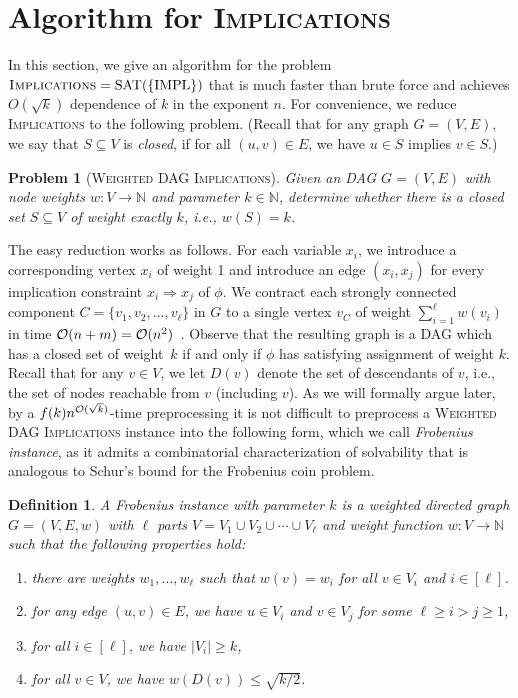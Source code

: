 \documentclass[10pt,a4paper]{article}
\newtheorem{defn}[thm]{Definition}
\newtheorem{problem}[thm]{Problem}
\newcommand{\nats}{\mathbb N}
\newcommand{\Oh}{{\cal O}}
\newcommand{\SAT}{\mathrm{SAT}}
\newcommand{\Impl}{\mathrm{IMPL}}
\newcommand{\Implication}{\textsc{Implications}\xspace}
\newcommand{\wDAGImplication}{\textsc{Weighted DAG Implications}\xspace}
\begin{document}
\section{Algorithm for \Implication}
\label{sec:implalgo}
%
In this section, we give an algorithm for the problem $\Implication = \SAT(\{\Impl\})$ that is much faster than brute force and achieves $O(\sqrt{k})$ dependence of $k$ in the exponent $n$. 
For convenience, we reduce \Implication to the following problem. (Recall that for any graph $G=(V,E)$, we say that $S\subseteq V$ is \emph{closed}, if for all $(u,v)\in E$, we have $u \in S$ implies $v\in S$.)
%
\begin{problem}[\wDAGImplication]
Given an DAG $G=(V,E)$ with node weights $w: V\to \nats$ and parameter $k\in \nats$, determine whether there is a closed set $S \subseteq V$ of weight exactly $k$, i.e., $w(S) = k$.
\end{problem}
The easy reduction works as follows. For each variable $x_i$, we introduce a corresponding vertex $x_i$ of weight 1 and introduce an edge $(x_i, x_j)$ for every implication constraint $x_i \Rightarrow x_j$ of $\phi$. We contract each strongly connected component $C=\{v_1, v_2, \dots, v_\ell\}$ in $G$ to a single vertex $v_C$ of weight $\sum_{i=1}^\ell w(v_i)$ in time $\Oh(n+m)= \Oh(n^2)$~\cite{Tarjan72}. Observe that the resulting graph is a DAG which has a closed set of weight~$k$ if and only if $\phi$ has satisfying assignment of weight $k$.
%
Recall that for any $v\in V$, we let $D(v)$ denote the set of descendants of $v$, i.e., the set of nodes reachable from $v$ (including $v$).
%
As we will formally argue later, by a $f(k)n^{\Oh(\sqrt{k})}$-time preprocessing it is not difficult to preprocess a \wDAGImplication instance into the following form, which we call \emph{Frobenius instance}, as it admits a combinatorial characterization of solvability that is analogous to Schur's bound for the Frobenius coin problem.
%
\begin{defn}
A \emph{Frobenius instance with parameter $k$} is a weighted directed graph $G = (V,E, w)$ with $\ell$ parts $V = V_1 \cup V_2 \cup \cdots \cup V_\ell$ and weight function $w:V \to \nats$ such that the following properties hold: 
\begin{enumerate}[label=(P\arabic*)]
\item\label{item:structweights} there are weights $w_1, \dots, w_\ell$ such that $w(v) = w_i$ for all $v\in V_i$ and $i \in [\ell]$.
\item\label{item:structedges} for any edge $(u,v)\in E$, we have $u\in V_i$ and $v\in V_j$ for some $\ell \ge i > j \ge 1$,
\item\label{item:size} for all $i\in [\ell]$, we have $|V_i| \ge k$, 
\item\label{item:weights} for all $v\in V$, we have $w(D(v)) \le \sqrt{k/2}$.
\end{enumerate}
\end{defn}
\end{document}
